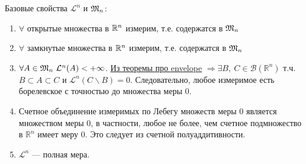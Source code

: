 \begin{remark}
     Базовые свойства $\mathcal{L}^n$ и $\mathfrak{M}_n$:
 \begin{enumerate}
     \item $\forall$ открытые множества в $\mathbb{R}^n$ измерим, т.е. содержатся в $\mathfrak{M}_n$
     \item $\forall$ замкнутые множества  в $\mathbb{R}^n$ измерим, т.е. содержатся в $\mathfrak{M}_n$
     \item $\forall A \in \mathfrak{M}_n\ \mathcal{L}^n(A) < +\infty $. \hyperlink{envelope}{Из теоремы про envelope} $\Longrightarrow \exists B,\ C \in \mathcal{B}(\mathbb{R}^n)$ т.ч. $B \subset A \subset C$ и $\mathcal{L}^n(C \backslash B) = 0$. Следовательно, любое измеримое есть борелевское с точностью до множества меры 0.
     \item Счетное объединение измеримых по Лебегу множеств меры 0 является множеством меры 0, в частности, любое не более, чем счетное подмножество в $\mathbb{R}^n$ имеет меру 0. Это следует из счетной полуаддитивности.
     \item $\mathcal{L}^n$ --- полная мера.
 \end{enumerate}
\end{remark}
